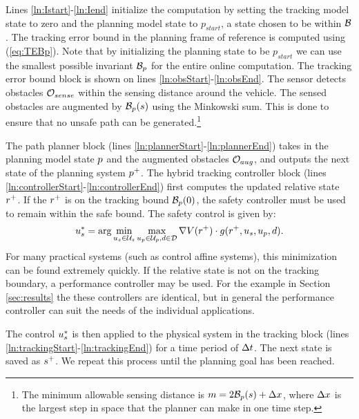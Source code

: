 Lines \ref{ln:Istart}-\ref{ln:Iend} initialize the computation by setting the tracking model state to zero and the planning model state to $p_{start}$, a state chosen to be within $\mathcal B$. The tracking error bound in the planning frame of reference is computed using (\ref{eq:TEBp}). Note that by initializing the planning state to be $p_{start}$ we can use the smallest possible invariant $\mathcal B_p$ for the entire online computation. The tracking error bound block is shown on lines \ref{ln:obsStart}-\ref{ln:obsEnd}. The sensor detects obstacles $\mathcal{O}_{sense}$ within the sensing distance around the vehicle. The sensed obstacles are augmented by $\mathcal B_p(s)$ using the Minkowski sum. This is done to ensure that no unsafe path can be generated.\footnote{The minimum allowable sensing distance is $m = 2\mathcal B_p(s) + \Delta x$, where $\Delta x$ is the largest step in space that the planner can make in one time step.}


 The path planner block (lines \ref{ln:plannerStart}-\ref{ln:plannerEnd}) takes in the planning model state $p$ and the augmented obstacles $\mathcal{O}_{aug}$, and outputs the next state of the planning system $p^+$. The hybrid tracking controller block (lines \ref{ln:controllerStart}-\ref{ln:controllerEnd}) first computes the updated relative state $r^+$. If the $r^+$ is on the tracking bound $\mathcal B_p(0)$, the safety controller must be used to remain within the safe bound. The safety control is given by:
\begin{equation}
  \label{eq:opt_ctrl}
	u_s^* = \arg\min_{u_s\in\mathcal{U}_s} \max_{u_p\in\mathcal{U}_p, d\in\mathcal{D}} \nabla V(r^+) \cdot g(r^+,u_s,u_p,d).
\end{equation}
For many practical systems (such as control affine systems), this minimization can be found extremely quickly. If the relative state is not on the tracking boundary, a performance controller may be used. For the example in Section \ref{sec:results} the these controllers are identical, but in general the performance controller can suit the needs of the individual applications.

The control $u_s^*$ is then applied to the physical system in the tracking block (lines \ref{ln:trackingStart}-\ref{ln:trackingEnd}) for a time period of $\Delta t$. The next state is saved as $s^+$. We repeat this process until the planning goal has been reached.